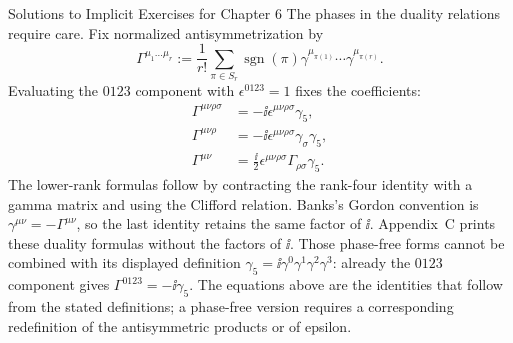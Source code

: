 \begin{bankssolutions}{Solutions to Implicit Exercises for Chapter 6}
The phases in the duality relations require care.  Fix normalized
antisymmetrization by
\begin{equation*}
 \Gamma^{\mu_1\ldots\mu_r}
 :=\frac1{r!}\sum_{\pi\in S_r}\operatorname{sgn}(\pi)
 \gamma^{\mu_{\pi(1)}}\cdots\gamma^{\mu_{\pi(r)}}.
\end{equation*}
Evaluating the
\(0123\) component with \(\epsilon^{0123}=1\) fixes the coefficients:
\begin{align*}
 \Gamma^{\mu\nu\rho\sigma}
 &=-\ii\epsilon^{\mu\nu\rho\sigma}\gamma_5,\\
 \Gamma^{\mu\nu\rho}
 &=-\ii\epsilon^{\mu\nu\rho\sigma}\gamma_\sigma\gamma_5,\\
 \Gamma^{\mu\nu}
 &=\frac{\ii}{2}\epsilon^{\mu\nu\rho\sigma}
   \Gamma_{\rho\sigma}\gamma_5.
\end{align*}
The lower-rank formulas follow by contracting the rank-four identity with a
gamma matrix and using the Clifford relation.  Banks's Gordon convention is
\(\gamma^{\mu\nu}=-\Gamma^{\mu\nu}\), so the last identity retains the
same factor of \(\ii\).  Appendix~C prints these duality formulas without
the factors of \(\ii\).  Those phase-free forms cannot be combined with
its displayed definition
\(\gamma_5=\ii\gamma^0\gamma^1\gamma^2\gamma^3\): already the
\(0123\) component gives
\(\Gamma^{0123}=-\ii\gamma_5\).  The equations above are the identities
that follow from the stated definitions; a phase-free version requires a
corresponding redefinition of the antisymmetric products or of epsilon.


\end{bankssolutions}
